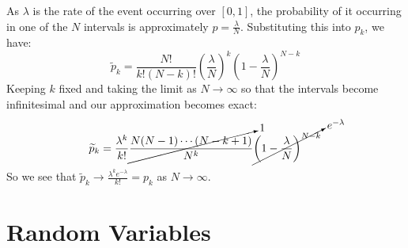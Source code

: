 \documentclass[../main.tex]{subfiles}
\begin{document}
As $\lambda$ is the rate of the event occurring over $[0, 1]$, the probability of it occurring in one of the $N$ intervals is approximately $p = \frac{\lambda}{N}$.
Substituting this into $p_k$, we have:
\[
  \widetilde{p}_k = \frac{N!}{k!(N - k)!} \left(\frac{\lambda}{N}\right)^{k} \left(1-\frac{\lambda}{N}\right)^{N - k}
\]
Keeping $k$ fixed and taking the limit as $N \to \infty$ so that the intervals become infinitesimal and our approximation becomes exact:
\[
  \widetilde{p}_k = \frac{\lambda^{k}}{k!} \cancelto{1}{\frac{N(N - 1) \cdots (N - k + 1)}{N^{k}}} \cancelto{e^{-\lambda}}{\left(1 - \frac{\lambda}{N}\right)^{N - k}}
\]
So we see that $\widetilde{p}_k \to \frac{\lambda^{k} e^{-\lambda}}{k!} = p_k$ as $N \to \infty$.
\section{Random Variables}
\end{document}
